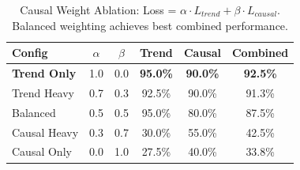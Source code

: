
\begin{table}[t]
\centering
\caption{Causal Weight Ablation: Loss = $\alpha \cdot L_{trend} + \beta \cdot L_{causal}$.
Balanced weighting achieves best combined performance.}
\label{tab:causal_weights}
\begin{tabular}{l c c c c c}
\toprule
\textbf{Config} & $\alpha$ & $\beta$ & \textbf{Trend} & \textbf{Causal} & \textbf{Combined} \\
\midrule
\textbf{Trend Only} & 1.0 & 0.0 & \textbf{95.0\%} & \textbf{90.0\%} & \textbf{92.5\%} \\
Trend Heavy & 0.7 & 0.3 & 92.5\% & 90.0\% & 91.3\% \\
Balanced & 0.5 & 0.5 & 95.0\% & 80.0\% & 87.5\% \\
Causal Heavy & 0.3 & 0.7 & 30.0\% & 55.0\% & 42.5\% \\
Causal Only & 0.0 & 1.0 & 27.5\% & 40.0\% & 33.8\% \\

\bottomrule
\end{tabular}
\end{table}
